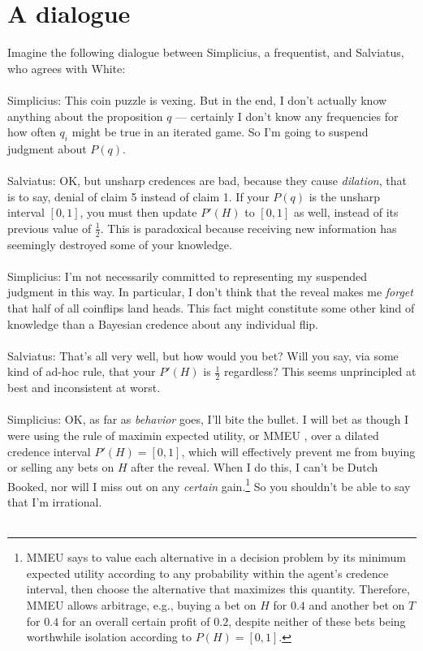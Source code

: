 \documentclass[letterpaper,12pt]{article}
\begin{document}
\section{A dialogue}
Imagine the following dialogue between Simplicius, a frequentist, and Salviatus, who agrees with White:\\ \\
Simplicius: This coin puzzle is vexing. But in the end, I don't actually know anything about the proposition $q$ --- certainly I don't know any frequencies for how often $q_i$ might be true in an iterated game. So I'm going to suspend judgment about $P(q)$.\\ \\
Salviatus: OK, but unsharp credences are bad, because they cause \emph{dilation}, that is to say, denial of claim 5 instead of claim 1. If your $P(q)$ is the unsharp interval $[0, 1]$, you must then update $P'(H)$ to $[0, 1]$ as well, instead of its previous value of $\frac{1}{2}$. This is paradoxical because receiving new information has seemingly destroyed some of your knowledge.\\ \\
Simplicius: I'm not necessarily committed to representing my suspended judgment in this way. In particular, I don't think that the reveal makes me \emph{forget} that half of all coinflips land heads. This fact might constitute some other kind of knowledge than a Bayesian credence about any individual flip.\\ \\
Salviatus: That's all very well, but how would you bet? Will you say, via some kind of ad-hoc rule, that your $P'(H)$ is $\frac{1}{2}$ regardless? This seems unprincipled at best and inconsistent at worst.\\ \\
Simplicius: OK, as far as \emph{behavior} goes, I'll bite the bullet. I will bet as though I were using the rule of maximin expected utility, or MMEU \citep{Gardenfors1982-GRDUPR}, over a dilated credence interval $P'(H) = [0, 1]$, which will effectively prevent me from buying or selling any bets on $H$ after the reveal. When I do this, I can't be Dutch Booked, nor will I miss out on any \emph{certain} gain.\footnote{MMEU says to value each alternative in a decision problem by its minimum expected utility according to any probability within the agent's credence interval, then choose the alternative that maximizes this quantity. Therefore, MMEU allows arbitrage, e.g., buying a bet on $H$ for $0.4$ and another bet on $T$ for $0.4$ for an overall certain profit of $0.2$, despite neither of these bets being worthwhile isolation according to $P(H) = [0, 1]$.} So you shouldn't be able to say that I'm irrational.\\ \\
\end{document}
